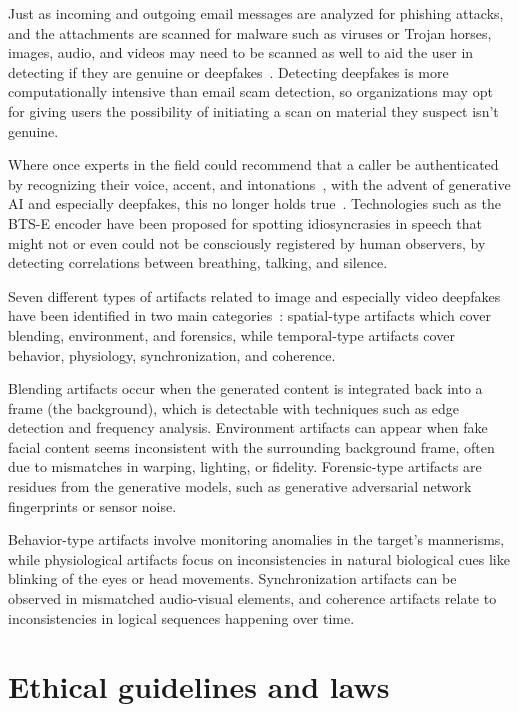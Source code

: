 Just as incoming and outgoing email messages are analyzed for phishing attacks, and the attachments are scanned for malware such as viruses or Trojan horses, images, audio, and videos may need to be scanned as well to aid the user in detecting if they are genuine or deepfakes~\citep{mirsky_Creation_Detection_Deepfakes_2021}. Detecting deepfakes is more computationally intensive than email scam detection, so organizations may opt for giving users the possibility of initiating a scan on material they suspect isn’t genuine.

Where once experts in the field could recommend that a caller be authenticated by recognizing their voice, accent, and intonations~\citep{mitnick_The_Art_of_Deception_2003}, with the advent of generative AI and especially deepfakes, this no longer holds true~\citep{doan_BTSE_Audio_Deepfake_Detection_2023}. Technologies such as the BTS-E encoder have been proposed for spotting idiosyncrasies in speech that might not or even could not be consciously registered by human observers, by detecting correlations between breathing, talking, and silence.

Seven different types of artifacts related to image and especially video deepfakes have been identified in two main categories~\citep{mirsky_Creation_Detection_Deepfakes_2021}: spatial-type artifacts which cover blending, environment, and forensics, while temporal-type artifacts cover behavior, physiology, synchronization, and coherence.

Blending artifacts occur when the generated content is integrated back into a frame (the background), which is detectable with techniques such as edge detection and frequency analysis. Environment artifacts can appear when fake facial content seems inconsistent with the surrounding background frame, often due to mismatches in warping, lighting, or fidelity. Forensic-type artifacts are residues from the generative models, such as generative adversarial network fingerprints or sensor noise.

Behavior-type artifacts involve monitoring anomalies in the target's mannerisms, while physiological artifacts focus on inconsistencies in natural biological cues like blinking of the eyes or head movements. Synchronization artifacts can be observed in mismatched audio-visual elements, and coherence artifacts relate to inconsistencies in logical sequences happening over time.






\section{Ethical guidelines and laws}

